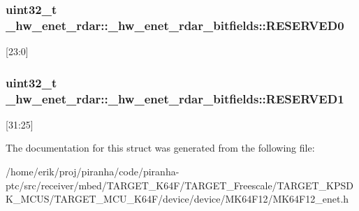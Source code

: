 \subsubsection[{\texorpdfstring{R\+E\+S\+E\+R\+V\+E\+D0}{RESERVED0}}]{\setlength{\rightskip}{0pt plus 5cm}uint32\+\_\+t \+\_\+hw\+\_\+enet\+\_\+rdar\+::\+\_\+hw\+\_\+enet\+\_\+rdar\+\_\+bitfields\+::\+R\+E\+S\+E\+R\+V\+E\+D0}\hypertarget{struct__hw__enet__rdar_1_1__hw__enet__rdar__bitfields_a0280ec6f5c8ededf0dacab6e129b2ea9}{}\label{struct__hw__enet__rdar_1_1__hw__enet__rdar__bitfields_a0280ec6f5c8ededf0dacab6e129b2ea9}
\mbox{[}23\+:0\mbox{]} 
\subsubsection[{\texorpdfstring{R\+E\+S\+E\+R\+V\+E\+D1}{RESERVED1}}]{\setlength{\rightskip}{0pt plus 5cm}uint32\+\_\+t \+\_\+hw\+\_\+enet\+\_\+rdar\+::\+\_\+hw\+\_\+enet\+\_\+rdar\+\_\+bitfields\+::\+R\+E\+S\+E\+R\+V\+E\+D1}\hypertarget{struct__hw__enet__rdar_1_1__hw__enet__rdar__bitfields_afb293b1a0c3be4bfe21d1f8731fc7791}{}\label{struct__hw__enet__rdar_1_1__hw__enet__rdar__bitfields_afb293b1a0c3be4bfe21d1f8731fc7791}
\mbox{[}31\+:25\mbox{]} 

The documentation for this struct was generated from the following file\+:\begin{DoxyCompactItemize}
\item 
/home/erik/proj/piranha/code/piranha-\/ptc/src/receiver/mbed/\+T\+A\+R\+G\+E\+T\+\_\+\+K64\+F/\+T\+A\+R\+G\+E\+T\+\_\+\+Freescale/\+T\+A\+R\+G\+E\+T\+\_\+\+K\+P\+S\+D\+K\+\_\+\+M\+C\+U\+S/\+T\+A\+R\+G\+E\+T\+\_\+\+M\+C\+U\+\_\+\+K64\+F/device/device/\+M\+K64\+F12/M\+K64\+F12\+\_\+enet.\+h\end{DoxyCompactItemize}
